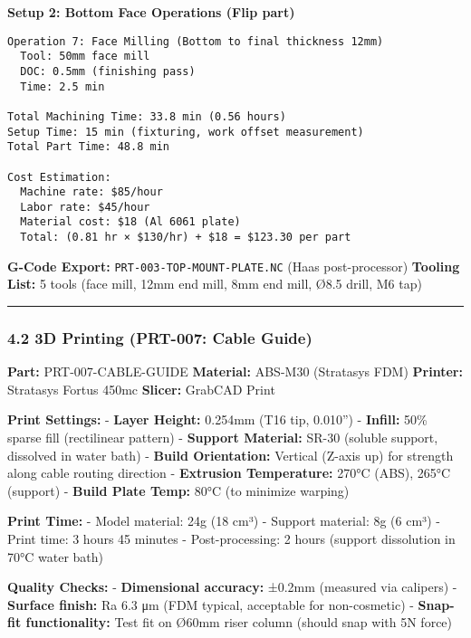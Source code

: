 \documentclass[
]{article}
\begin{document}
\textbf{Setup 2: Bottom Face Operations (Flip part)}

\begin{verbatim}
Operation 7: Face Milling (Bottom to final thickness 12mm)
  Tool: 50mm face mill
  DOC: 0.5mm (finishing pass)
  Time: 2.5 min

Total Machining Time: 33.8 min (0.56 hours)
Setup Time: 15 min (fixturing, work offset measurement)
Total Part Time: 48.8 min

Cost Estimation:
  Machine rate: $85/hour
  Labor rate: $45/hour
  Material cost: $18 (Al 6061 plate)
  Total: (0.81 hr × $130/hr) + $18 = $123.30 per part
\end{verbatim}

\textbf{G-Code Export:} \texttt{PRT-003-TOP-MOUNT-PLATE.NC} (Haas
post-processor) \textbf{Tooling List:} 5 tools (face mill, 12mm end
mill, 8mm end mill, Ø8.5 drill, M6 tap)

\begin{center}\rule{0.5\linewidth}{0.5pt}\end{center}

\hypertarget{d-printing-prt-007-cable-guide}{%
\subsubsection{4.2 3D Printing (PRT-007: Cable
Guide)}\label{d-printing-prt-007-cable-guide}}

\textbf{Part:} PRT-007-CABLE-GUIDE \textbf{Material:} ABS-M30 (Stratasys
FDM) \textbf{Printer:} Stratasys Fortus 450mc \textbf{Slicer:} GrabCAD
Print

\textbf{Print Settings:} - \textbf{Layer Height:} 0.254mm (T16 tip,
0.010'') - \textbf{Infill:} 50\% sparse fill (rectilinear pattern) -
\textbf{Support Material:} SR-30 (soluble support, dissolved in water
bath) - \textbf{Build Orientation:} Vertical (Z-axis up) for strength
along cable routing direction - \textbf{Extrusion Temperature:} 270°C
(ABS), 265°C (support) - \textbf{Build Plate Temp:} 80°C (to minimize
warping)

\textbf{Print Time:} - Model material: 24g (18 cm³) - Support material:
8g (6 cm³) - Print time: 3 hours 45 minutes - Post-processing: 2 hours
(support dissolution in 70°C water bath)

\textbf{Quality Checks:} - \textbf{Dimensional accuracy:} ±0.2mm
(measured via calipers) - \textbf{Surface finish:} Ra 6.3 μm (FDM
typical, acceptable for non-cosmetic) - \textbf{Snap-fit functionality:}
Test fit on Ø60mm riser column (should snap with 5N force)
\end{document}

